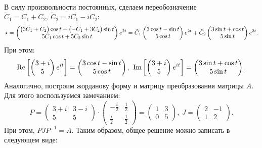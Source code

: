 \begin{enumerate}
\[\begin{split}
				\end{split} \]
				В силу произвольности постоянных, сделаем переобозначение \( \tilde{C}_1 = C_1 + C_2, ~ \tilde{C}_2 = iC_1 - iC_2 \):
				\[ \star = \begin{pmatrix} \left( 3\tilde{C}_1 + \tilde{C}_2 \right) \cos{t} + \left( -\tilde{C}_1 + 3\tilde{C}_2 \right) \sin{t} \\ 5\tilde{C}_1 \cos{t} + 5\tilde{C}_2 \sin{t} \end{pmatrix} e^{2t} = \tilde{C}_1 \begin{pmatrix} 3\cos{t} - \sin{t} \\5 \cos{t} \end{pmatrix} e^{2t} + \tilde{C}_2 \begin{pmatrix} 3\sin{t} + \cos{t} \\5 \sin{t} \end{pmatrix} e^{2t}. \]
				При этом:
				\[ \operatorname{Re}\left[ \begin{pmatrix} 3 + i \\ 5 \end{pmatrix} e^{it} \right] = \begin{pmatrix} 3\cos{t} - \sin{t} \\5 \cos{t} \end{pmatrix}, ~ \operatorname{Im}\left[ \begin{pmatrix} 3 + i \\ 5 \end{pmatrix} e^{it} \right] = \begin{pmatrix} 3\sin{t} + \cos{t} \\5 \sin{t} \end{pmatrix}. \]
				Аналогично, построим жорданову форму и матрицу преобразования матрицы $A$. Для этого воспользуемся замечанием:
				\[ P = \begin{pmatrix} 3 + i & 3 - i \\ 5 & 5 \end{pmatrix} \cdot \begin{pmatrix} -\frac{i}{2} & \frac{1}{2} \\ \frac{i}{2} & \frac{1}{2} \end{pmatrix} = \begin{pmatrix} 1 & 3 \\ 0 & 5 \end{pmatrix}, ~ J = \begin{pmatrix} 2 & -1 \\ 1 & 2 \end{pmatrix}. \]
				При этом, $PJP^{-1} = A$. Таким образом, общее решение можно записать в следующем виде:

\end{enumerate}
